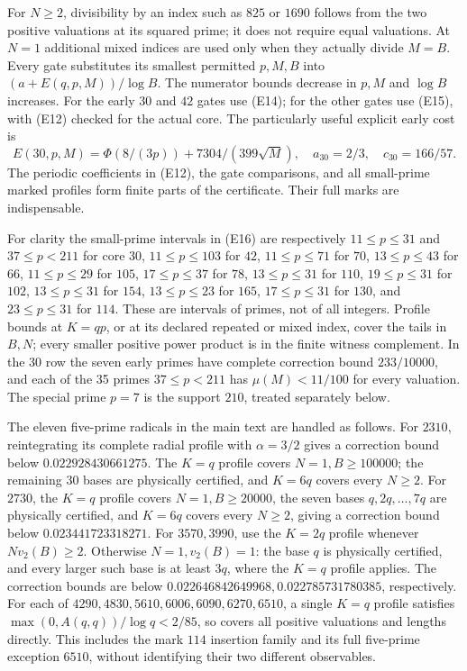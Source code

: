 \documentclass[11pt]{article}
\theoremstyle{definition}\newtheorem{definition}[theorem]{Definition}
\theoremstyle{remark}\newtheorem{remark}[theorem]{Remark}
\begin{document}
For \(N\ge2\), divisibility by an index such as \(825\) or \(1690\)
follows from the two positive valuations at its squared prime; it does
not require equal valuations. At \(N=1\) additional mixed indices are
used only when they actually divide \(M=B\).
Every gate substitutes its smallest permitted \(p,M,B\) into
\((a+E(q,p,M))/\log B\). The numerator bounds decrease in \(p,M\)
and \(\log B\) increases. For the early \(30\) and \(42\) gates use
(E14); for the other gates use (E15), with (E12) checked for the actual
core. The particularly useful explicit early cost is
\[
 E(30,p,M)=\Phi(8/(3p))+7304/(399\sqrt M),
 \quad a_{30}=2/3,\quad c_{30}=166/57 .                             \tag{E18}
\]
The periodic coefficients in (E12), the gate comparisons, and all
small-prime marked profiles form finite parts of the certificate.
Their full marks are indispensable.

For clarity the small-prime intervals in (E16) are respectively
\(11\le p\le31\) and \(37\le p<211\) for core \(30\),
\(11\le p\le103\) for \(42\), \(11\le p\le71\) for \(70\),
\(13\le p\le43\) for \(66\), \(11\le p\le29\) for \(105\),
\(17\le p\le37\) for \(78\), \(13\le p\le31\) for \(110\),
\(19\le p\le31\) for \(102\), \(13\le p\le31\) for \(154\),
\(13\le p\le23\) for \(165\), \(17\le p\le31\) for \(130\), and
\(23\le p\le31\) for \(114\). These are intervals of primes, not of
all integers. Profile bounds at \(K=q p\), or at its declared repeated
or mixed index, cover the tails in \(B,N\); every smaller positive
power product is in the finite witness complement. In the \(30\)
row the seven early primes have complete correction bound
\(233/10000\), and each of the 35 primes \(37\le p<211\) has
\(\mu(M)<11/100\) for every valuation. The special prime \(p=7\)
is the support \(210\), treated separately below.

The eleven five-prime radicals in the main text are handled as follows.
For \(2310\), reintegrating its complete radial profile with
\(\alpha=3/2\) gives a correction bound below
\(0.022928430661275\). The \(K=q\) profile covers \(N=1,B\ge100000\);
the remaining 30 bases are physically certified, and \(K=6q\)
covers every \(N\ge2\). For \(2730\), the \(K=q\) profile covers
\(N=1,B\ge20000\), the seven bases \(q,2q,\ldots,7q\) are physically
certified, and \(K=6q\) covers every \(N\ge2\), giving a correction
bound below \(0.023441723318271\).
For \(3570,3990\), use the \(K=2q\) profile whenever
\(Nv_2(B)\ge2\). Otherwise \(N=1,v_2(B)=1\): the base \(q\) is
physically certified, and every larger such base is at least \(3q\),
where the \(K=q\) profile applies. The correction bounds are below
\(0.022646842649968,0.022785731780385\), respectively.
For each of \(4290,4830,5610,6006,6090,6270,6510\), a single
\(K=q\) profile satisfies \(\max(0,A(q,q))/\log q<2/85\), so covers
all positive valuations and lengths directly. This includes the
mark \(114\) insertion family and its full five-prime exception
\(6510\), without identifying their two different observables.
\end{document}
